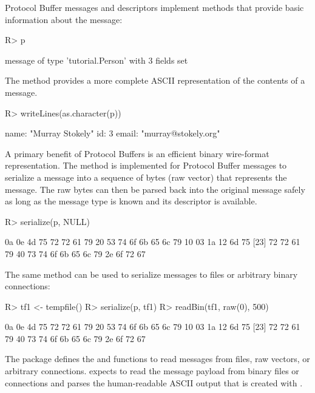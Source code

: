 \documentclass[article]{jss}
\begin{document}
Protocol Buffer messages and descriptors implement 
methods that provide basic information about the message:
%
\begin{Schunk}
\begin{Sinput}
R> p
\end{Sinput}
\begin{Soutput}
message of type 'tutorial.Person' with 3 fields set
\end{Soutput}
\end{Schunk}
%
The  method provides a more complete ASCII
representation of the contents of a message.
%
\begin{Schunk}
\begin{Sinput}
R> writeLines(as.character(p))
\end{Sinput}
\begin{Soutput}
name: "Murray Stokely"
id: 3
email: "murray@stokely.org"
\end{Soutput}
\end{Schunk}
%
A primary benefit of Protocol Buffers is an efficient
binary wire-format representation.
The  method is implemented for
Protocol Buffer messages to serialize a message into a sequence of
bytes (raw vector) that represents the message.
The raw bytes can then be parsed back into the original message safely
as long as the message type is known and its descriptor is available.
%
\begin{Schunk}
\begin{Sinput}
R> serialize(p, NULL)
\end{Sinput}
\begin{Soutput}
 [1] 0a 0e 4d 75 72 72 61 79 20 53 74 6f 6b 65 6c 79 10 03 1a 12 6d 75
[23] 72 72 61 79 40 73 74 6f 6b 65 6c 79 2e 6f 72 67
\end{Soutput}
\end{Schunk}
%
The same method can be used to serialize messages to files or arbitrary binary connections:
%
\begin{Schunk}
\begin{Sinput}
R> tf1 <- tempfile()
R> serialize(p, tf1)
R> readBin(tf1, raw(0), 500)
\end{Sinput}
\begin{Soutput}
 [1] 0a 0e 4d 75 72 72 61 79 20 53 74 6f 6b 65 6c 79 10 03 1a 12 6d 75
[23] 72 72 61 79 40 73 74 6f 6b 65 6c 79 2e 6f 72 67
\end{Soutput}
\end{Schunk}
%
The  package defines the  and
 functions to read messages from files, raw vectors,
or arbitrary connections.   expects to read the message
payload from binary files or connections and  parses
the human-readable ASCII output that is created with
.
\end{document}
